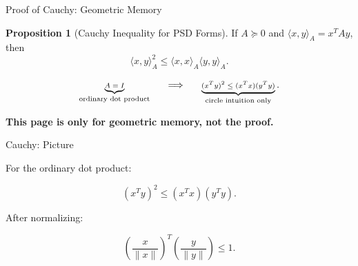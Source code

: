 \documentclass[10pt]{beamer}
\theoremstyle{definition}
\newtheorem{prop}{Proposition}[section]
\newcommand{\x}[1]{\alert{\textbf{#1}}}
\begin{document}
\begin{frame}{Proof of Cauchy: Geometric Memory}

\begin{prop}[Cauchy Inequality for PSD Forms]
If $A\succeq0$ and $\langle x,y\rangle_A=x^TAy$, then
$$
\boxed{\langle x,y\rangle_A^2
\le
\langle x,x\rangle_A\langle y,y\rangle_A.}
$$
\end{prop}

\vfill

\[
\scriptsize
\underbrace{A=I}_{\text{ordinary dot product}}
\qquad\Longrightarrow\qquad
\underbrace{(x^Ty)^2\le (x^Tx)(y^Ty)}_{\text{circle intuition only}}.
\]

\vfill

\begin{center}
\x{This page is only for geometric memory, not the proof.}
\end{center}

\vfill

\end{frame}


\begin{frame}{Cauchy: Picture}

For the ordinary dot product:

$$
(x^Ty)^2\le (x^Tx)(y^Ty).
$$

\vfill

After normalizing:

$$
\left(\frac{x}{\|x\|}\right)^T
\left(\frac{y}{\|y\|}\right)
\le 1.
$$

\vfill

\begin{center}
\end{center}

\end{frame}
\end{document}
